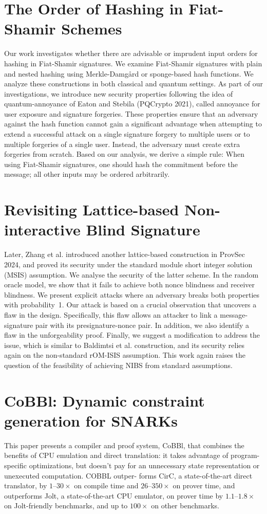 \documentclass[11pt,oneside]{book}
\theoremstyle{definition}
\theoremstyle{remark}
\theoremstyle{plain}
\begin{document}
\section{\cite{cryptoeprint:2025/1846} The Order of Hashing in Fiat-Shamir Schemes}
Our work investigates whether there are advisable or imprudent input orders for hashing in Fiat-Shamir signatures. We examine Fiat-Shamir signatures with plain and nested hashing using Merkle-Damgård or sponge-based hash functions. We analyze these constructions in both classical and quantum settings. As part of our investigations, we introduce new security properties following the idea of quantum-annoyance of Eaton and Stebila (PQCrypto 2021), called annoyance for user exposure and signature forgeries. These properties ensure that an adversary against the hash function cannot gain a significant advantage when attempting to extend a successful attack on a single signature forgery to multiple users or to multiple forgeries of a single user. Instead, the adversary must create extra forgeries from scratch. Based on our analysis, we derive a simple rule: When using Fiat-Shamir signatures, one should hash the commitment before the message; all other inputs may be ordered arbitrarily.

\section{\cite{cryptoeprint:2025/1848} Revisiting Lattice-based Non-interactive Blind Signature}
Later, Zhang et al. introduced another lattice-based construction in ProvSec 2024, and proved its security under the standard module short integer solution (MSIS) assumption. We analyse the security of the latter scheme. In the random oracle model, we show that it fails to achieve both nonce blindness and receiver blindness. We present explicit attacks where an adversary breaks both properties with probability~1. Our attack is based on a crucial observation that uncovers a flaw in the design. Specifically, this flaw allows an attacker to link a message-signature pair with its presignature-nonce pair. In addition, we also identify a flaw in the unforgeability proof. Finally, we suggest a modification to address the issue, which is similar to Baldimtsi et al. construction, and its security relies again on the non-standard rOM-ISIS assumption. This work again raises the question of the feasibility of achieving NIBS from standard assumptions.

\section{\cite{cryptoeprint:2025/1849} CoBBl: Dynamic constraint generation for SNARKs}
This paper presents a compiler and proof system, CoBBl, that combines the benefits of CPU emulation and direct translation: it takes advantage of program-specific optimizations, but doesn’t pay for an unnecessary state representation or unexecuted computation. COBBL outper- forms CirC, a state-of-the-art direct translator, by $1–30\times$ on compile time and $26–350\times$ on prover time, and outperforms Jolt, a state-of-the-art CPU emulator, on prover time by $1.1– 1.8\times$ on Jolt-friendly benchmarks, and up to $100\times$ on other benchmarks.
\end{document}
